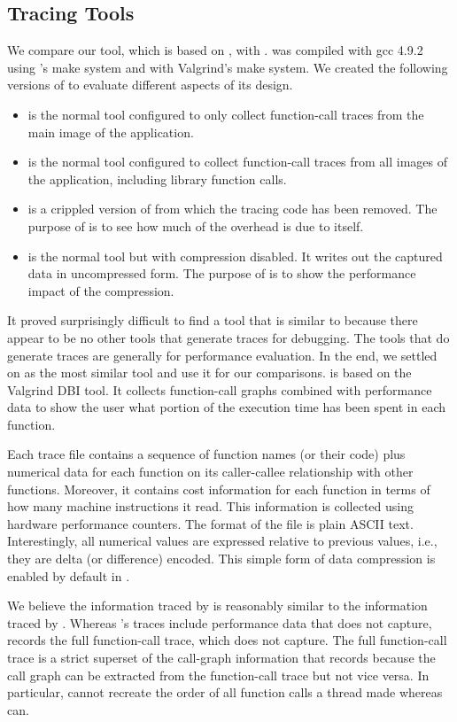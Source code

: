 \subsection{Tracing Tools}

We compare our \parlot tool, which is based on , with . \parlot was compiled with gcc 4.9.2 using \pin 's make system and \callgrind with Valgrind's make system. We created the following versions of \parlot to evaluate different aspects of its design.

\begin{itemize}
\item \textbf{\parlotm} is the normal \parlot tool configured to only collect function-call traces from the main image of the application.
\item \textbf{\parlota} is the normal \parlot tool configured to collect function-call traces from all images of the application, including library function calls.
\item \textbf{\pininit} is a crippled version of \parlot from which the tracing code has been removed. The purpose of \pininit is to see how much of the overhead is due to \pin itself.
\item \textbf{\parlotnc} is the normal \parlot tool but with compression disabled. It writes out the captured data in uncompressed form. The purpose of \parlotnc is to show the performance impact of the compression.
\end{itemize}


It proved surprisingly difficult to find a tool that is similar to \parlot because there appear to be no other tools that generate traces for debugging. The tools that do generate traces are generally for performance evaluation. In the end, we settled on \callgrind as the most similar tool and use it for our comparisons. \callgrind is based on the Valgrind DBI tool. It collects function-call graphs combined with performance data to show the user what portion of the execution time has been spent in each function.

Each \callgrind trace file contains a sequence of function names (or their code) plus numerical data for each function on its caller-callee relationship with other functions. Moreover, it contains cost information for each function in terms of how many machine instructions it read. This information is collected using hardware performance counters. The format of the file is plain ASCII text. Interestingly, all numerical values are expressed relative to previous values, i.e., they are delta (or difference) encoded. This simple form of data compression is enabled by default in \callgrind.

We believe the information traced by \callgrind is reasonably similar to the information traced by \parlotm. Whereas \callgrind 's traces include performance data that \parlot does not capture, \parlot records the full function-call trace, which \callgrind does not capture. The full function-call trace is a strict superset of the call-graph information that \callgrind records because the call graph can be extracted from the function-call trace but not vice versa. In particular, \callgrind cannot recreate the order of all function calls a thread made whereas \parlot can.

